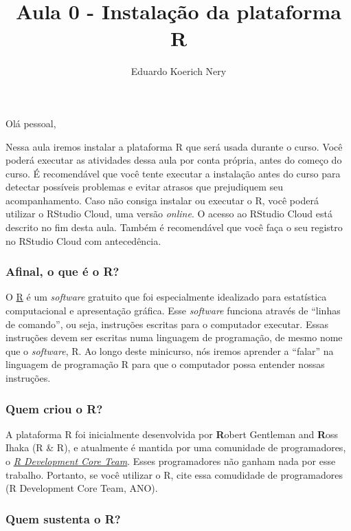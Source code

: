 \documentclass[
]{article}
\title{Aula 0 - Instalação da plataforma R}
\author{Eduardo Koerich Nery}
\date{}
\begin{document}
\maketitle

Olá pessoal,

Nessa aula iremos instalar a plataforma R que será usada durante o
curso. Você poderá executar as atividades dessa aula por conta própria,
antes do começo do curso. É recomendável que você tente executar a
instalação antes do curso para detectar possíveis problemas e evitar
atrasos que prejudiquem seu acompanhamento. Caso não consiga instalar ou
executar o R, você poderá utilizar o RStudio Cloud, uma versão
\emph{online}. O acesso ao RStudio Cloud está descrito no fim desta
aula. Também é recomendável que você faça o seu registro no RStudio
Cloud com antecedência.

\hypertarget{afinal-o-que-uxe9-o-r}{%
\subsubsection{Afinal, o que é o R?}\label{afinal-o-que-uxe9-o-r}}

O \href{https://www.r-project.org/}{R} é um \emph{software} gratuito que
foi especialmente idealizado para estatística computacional e
apresentação gráfica. Esse \emph{software} funciona através de ``linhas
de comando'', ou seja, instruções escritas para o computador executar.
Essas instruções devem ser escritas numa linguagem de programação, de
mesmo nome que o \emph{software}, R. Ao longo deste minicurso, nós
iremos aprender a ``falar'' na linguagem de programação R para que o
computador possa entender nossas instruções.

\hypertarget{quem-criou-o-r}{%
\subsubsection{Quem criou o R?}\label{quem-criou-o-r}}

A plataforma R foi inicialmente desenvolvida por \textbf{R}obert
Gentleman and \textbf{R}oss Ihaka (R \& R), e atualmente é mantida por
uma comunidade de programadores, o
\href{https://www.r-project.org/contributors.html}{\emph{R Development
Core Team}}. Esses programadores não ganham nada por esse trabalho.
Portanto, se você utilizar o R, cite essa comudidade de programadores (R
Development Core Team, ANO).

\hypertarget{quem-sustenta-o-r}{%
\subsubsection{Quem sustenta o R?}\label{quem-sustenta-o-r}}
\end{document}
